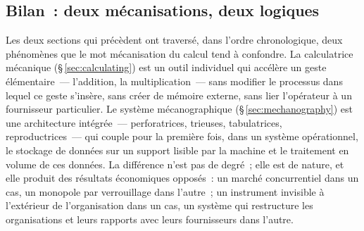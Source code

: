 


\subsection*{Bilan~: deux mécanisations, deux logiques}\label{subsec:bilan_compute}

Les deux sections qui précèdent ont traversé, dans l'ordre chronologique, deux phénomènes que le mot \og mécanisation du calcul\fg{} tend à confondre. La calculatrice mécanique (§\,\ref{sec:calculating}) est un outil individuel qui accélère un geste élémentaire~--- l'addition, la multiplication~--- sans modifier le processus dans lequel ce geste s'insère, sans créer de mémoire externe, sans lier l'opérateur à un fournisseur particulier. Le système mécanographique (§\,\ref{sec:mechanography}) est une architecture intégrée~--- perforatrices, trieuses, tabulatrices, reproductrices~--- qui couple pour la première fois, dans un système opérationnel, le stockage de données sur un support lisible par la machine et le traitement en volume de ces données. La différence n'est pas de degré~; elle est de nature, et elle produit des résultats économiques opposés~: un marché concurrentiel dans un cas, un monopole par verrouillage dans l'autre~; un instrument invisible à l'extérieur de l'organisation dans un cas, un système qui restructure les organisations et leurs rapports avec leurs fournisseurs dans l'autre.

